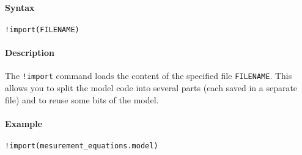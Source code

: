


	\paragraph{Syntax}

\begin{verbatim}
!import(FILENAME)
\end{verbatim}

\paragraph{Description}

The \texttt{!import} command loads the content of the specified file
\texttt{FILENAME}. This allows you to split the model code into several
parts (each saved in a separate file) and to reuse some bits of the
model.

\paragraph{Example}

\begin{verbatim}
!import(mesurement_equations.model)
\end{verbatim}



